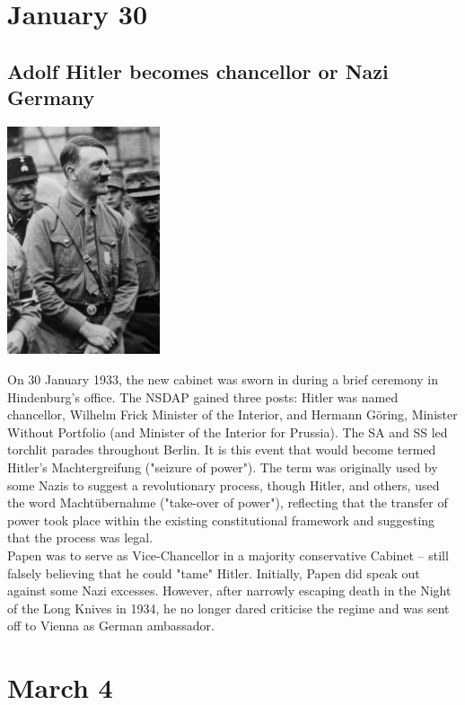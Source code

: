 \documentclass[11pt]{report}
\begin{document}
\section{January 30}
\subsection{Adolf Hitler becomes chancellor or Nazi Germany}
\vspace{2mm}\begin{center}\includegraphics[width=4.5cm]{./img/hitlerChancellor.jpg}\end{center}
On 30 January 1933, the new cabinet was sworn in during a brief ceremony in Hindenburg's office. The NSDAP gained three posts: Hitler was named chancellor, Wilhelm Frick Minister of the Interior, and Hermann Göring, Minister Without Portfolio (and Minister of the Interior for Prussia). The SA and SS led torchlit parades throughout Berlin. It is this event that would become termed Hitler's Machtergreifung ("seizure of power"). The term was originally used by some Nazis to suggest a revolutionary process, though Hitler, and others, used the word Machtübernahme ("take-over of power"), reflecting that the transfer of power took place within the existing constitutional framework and suggesting that the process was legal.\\ \indent Papen was to serve as Vice-Chancellor in a majority conservative Cabinet – still falsely believing that he could "tame" Hitler. Initially, Papen did speak out against some Nazi excesses. However, after narrowly escaping death in the Night of the Long Knives in 1934, he no longer dared criticise the regime and was sent off to Vienna as German ambassador.
\section{March 4}
\end{document}
